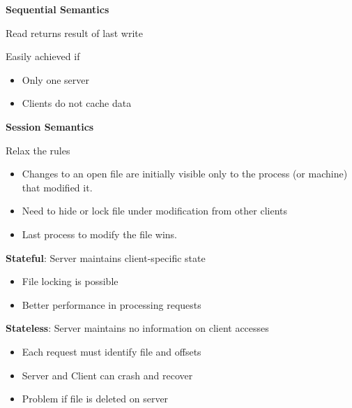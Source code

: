 \begin{slide}
	
	
	\begin{minipage}[t]{0.45\textwidth}
	\textbf{Sequential Semantics}
	\medskip
	
	Read returns result of last write
	\medskip
	
	Easily achieved if
	\begin{itemize}
		\item Only one server
		\item Clients do not cache data
	\end{itemize}
	\end{minipage}
	\hfill
	\begin{minipage}[t]{0.45\textwidth}
	\textbf{Session Semantics}
	\medskip
	
	Relax the rules
	\begin{itemize}
		\item Changes to an open file are initially visible only to the process (or machine) that modified it.
		\item Need to hide or lock file under modification from other clients
		\item Last process to modify the file wins.
	\end{itemize}
	\end{minipage}
	
\end{slide}

\begin{slide}

	
	\textbf{Stateful}: Server maintains client-specific state
	\begin{itemize}
		\item File locking is possible
		\item Better performance in processing requests
	\end{itemize}
	\bigskip
	
	\textbf{Stateless}: Server maintains no information on client accesses
	\begin{itemize}
		\item Each request must identify file and offsets
		\item Server and Client can crash and recover		
		\item Problem if file is deleted on server
	\end{itemize}
	
\end{slide}

